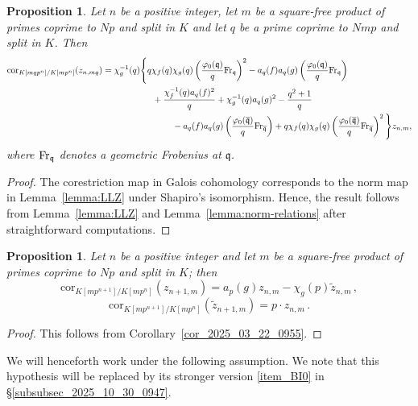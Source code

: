\documentclass{amsart}
\numberwithin{equation}{section}
\newtheorem{proposition}[theorem]{Proposition}
\newcommand{\frk}{\mathfrak}
\newcommand{\Fr}{{\rm Fr}}
\begin{document}
\begin{proposition}\label{prop:horizontal-norm}
    Let $n$ be a positive integer, let $m$ be a square-free product of primes coprime to $Np$ and split in $K$ and let $q$ be a prime coprime to $Nmp$ and split in $K$. Then
    \begin{align*}
        \mathrm{cor}_{K[mqp^n]/K[mp^n]}(z_{n,mq}) &= \chi_g^{-1}(q)\Bigg\{ q\chi_f(q)\chi_g(q) \left(\frac{\varphi_0(\frk{q})}{q}\Fr_{\frk{q}}\right)^2 -a_q(f)a_q(g) \left(\frac{\varphi_0(\frk{q})}{q}\Fr_{\frk{q}}\right) \\
        & \hspace{2cm} +\frac{\chi_f^{-1}(q)a_q(f)^2}{q}+ \chi_{g}^{-1}(q)a_{q}(g)^2-\frac{q^2+1}{q} \\
        &\hspace{2.8cm} -a_q(f)a_q(g) \left(\frac{\varphi_0(\overline{\frk{q}})}{q}\Fr_{\overline{\frk{q}}}\right) +q\chi_f(q)\chi_g(q) \left(\frac{\varphi_0(\overline{\frk{q}})}{q}\Fr_{\overline{\frk{q}}}\right)^2 \Bigg\} z_{n,m},
    \end{align*}
    where $\Fr_\frk{q}$ denotes a geometric Frobenius at $\frk{q}$.
\end{proposition}
\begin{proof}
The corestriction map in Galois cohomology corresponds to the norm map in Lemma~\ref{lemma:LLZ} under Shapiro's isomorphism. Hence, the result follows from Lemma~\ref{lemma:LLZ} and Lemma~\ref{lemma:norm-relations} after straightforward computations.
\end{proof}


\begin{proposition}
\label{prop:2025_08_11_1553}
    Let $n$ be a positive integer and let $m$ be a square-free product of primes coprime to $Np$ and split in $K$; then
    \begin{equation*}
        \mathrm{cor}_{K[mp^{n+1}]/K[mp^n]}(z_{n+1,m})=a_p(g) z_{n,m}-\chi_g(p)\tilde{z}_{n,m}\,,
    \end{equation*}
    \begin{equation*}
        \mathrm{cor}_{K[mp^{n+1}]/K[mp^n]}(\tilde{z}_{n+1,m})=p\cdot z_{n,m}\,.
    \end{equation*}
\end{proposition}
\begin{proof}
    This follows from Corollary~\ref{cor_2025_03_22_0955}.
\end{proof}


We will henceforth work under the following assumption. We note that this hypothesis will be replaced by its stronger version \eqref{item_BI0} in \S\ref{subsubsec_2025_10_30_0947}.
\end{document}
